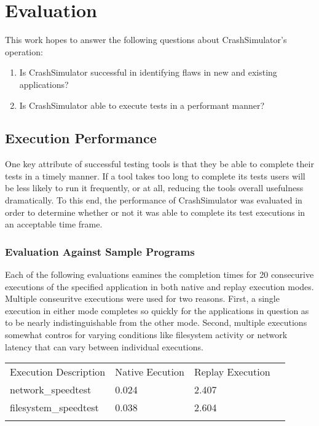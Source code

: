 \section{Evaluation}

    This work hopes to answer the following questions about CrashSimulator's operation:

        \begin{enumerate}
            \item{Is CrashSimulator successful in identifying flaws in new and existing applications?}
            \item{Is CrashSimulator able to execute tests in a performant manner?}
        \end{enumerate}

    \subsection{Execution Performance}

        One key attribute of successful testing tools is that they be able to complete their tests in a timely manner.
        If a tool takes too long to complete its tests users will be less likely to run it frequently, or at all,
        reducing the tools overall usefulness dramatically. To this end, the performance of CrashSimulator was evaluated
        in order to determine whether or not it was able to complete its test executions in an acceptable time frame.

        \subsubsection{Evaluation Against Sample Programs}

        Each of the following evaluations eamines the completion times for 20 consecurive executions of the specified
        application in both native and replay execution modes.  Multiple conseuritve executions were used for two
        reasons.  First, a single execution in either mode completes so quickly for the applications in question as to
        be nearly indistinguishable from the other mode.  Second, multiple executions somewhat contros for varying
        conditions like filesystem activity or network latency that can vary between individual executions.

            \begin{table}[H]
                \scriptsize{}
                \begin{tabular}{l  l  l  l}
                    \toprule{}
                        Execution Description & Native Eecution & Replay Execution\\
                        network\_speedtest & 0.024 & 2.407 \\
                        filesystem\_speedtest & 0.038 & 2.604 \\
                    \bottomrule{}
                \end{tabular}
            \end{table}

